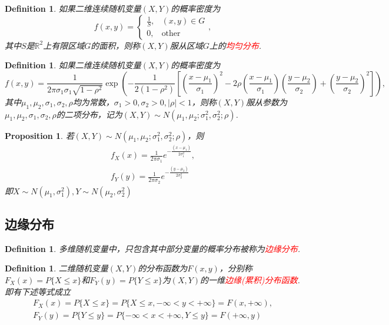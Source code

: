 \documentclass{article}
\newtheorem{proposition}[theorem]{Proposition}
\newtheorem{definition}[theorem]{Definition}
\newcommand{\redt}[1]{\textcolor{red}{#1}}
\begin{document}
\begin{definition}
\rm 如果二维连续随机变量$(X,Y)$的概率密度为
$$
f(x,y) = \left\{\begin{array}{ll}
\frac{1}{S}, & (x,y) \in G\\
0, & \text{other}
\end{array}\right. ,
$$
其中$S$是$\mathbb{R}^2$上有限区域$G$的面积，则称$(X,Y)$服从区域$G$上的\redt{均匀分布}.
\end{definition}

\begin{definition}
\rm 如果二维连续随机变量$(X,Y)$的概率密度为
$$
f(x,y)={\frac {1}{2\pi \sigma _{1}\sigma _{1}{\sqrt {1-\rho ^{2}}}}}\mathrm \exp\left({-{\frac {1}{2(1-\rho ^{2})}}\left[\left({\frac {x-\mu _{1}}{\sigma _{1}}}\right)^{2}-2\rho \left({\frac {x-\mu _{1}}{\sigma _{1}}}\right)\left({\frac {y-\mu _{2}}{\sigma _{2}}}\right)+\left({\frac {y-\mu _{2}}{\sigma _{2}}}\right)^{2}\right]}\right),
$$
其中$\mu_1,\mu_2,\sigma_1,\sigma_2,\rho$均为常数，$\sigma_1 > 0,\sigma_2 > 0, |\rho| < 1$，则称$(X,Y)$服从参数为$\mu_1,\mu_2,\sigma_1,\sigma_2,\rho$的二项分布，记为$(X,Y) \sim N(\mu_1,\mu_2;\sigma_1^2,\sigma_2^2; \rho)$. 
\end{definition}

\begin{proposition}
\rm 若$(X,Y) \sim N(\mu_1,\mu_2;\sigma_1^2,\sigma_2^2; \rho)$，则
$$
\begin{array}{ll}
f_X(x) = \frac{1}{2\pi\sigma_1}e^{-\frac{(x-\mu_1)}{2\sigma_1^2}}, \\
f_Y(y) = \frac{1}{2\pi\sigma_2}e^{-\frac{(y-\mu_2)}{2\sigma_2^2}}
\end{array}
$$
即$X \sim N(\mu_1,\sigma_1^2),Y \sim N(\mu_2,\sigma_2^2)$
\end{proposition}


\subsection{边缘分布}

\begin{definition}
\rm 多维随机变量中，只包含其中部分变量的概率分布被称为\redt{边缘分布}.
\end{definition}

\begin{definition}
\rm 二维随机变量$(X,Y)$的分布函数为$F(x,y)$，分别称$F_X(x)=P\{X \leq x\}$和$F_Y(y) = P\{Y \leq x\}$为$(X,Y)$的一维\redt{边缘(累积)分布函数}. 即有下述等式成立
$$
\begin{array}{ll}
F_X(x) = P\{X \leq x\} = P\{X \leq x,  -\infty < y < +\infty\} = F(x,+\infty),\\
F_Y(y) = P\{Y \leq y\} = P\{-\infty < x < +\infty, Y \leq y\} = F(+\infty,y)
\end{array}
$$
\end{definition}
\end{document}
